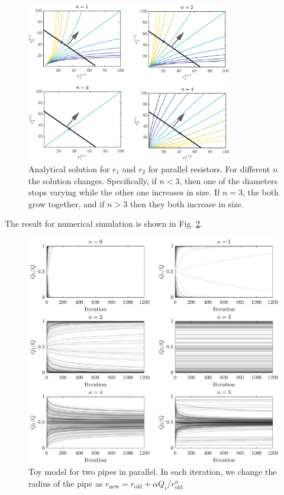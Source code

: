 \begin{figure}[h]
  \centerline{\includegraphics[width=0.8\textwidth]{./Figs/par_resistors}}
  \caption{Analytical solution for $r_1$ and $r_2$ for parallel
    resistors. For different $n$ the solution changes. Specifically,
    if $n<3$, then one of the diameters stops varying while the other
    one increases in size. If $n=3$, the both grow together, and if
    $n>3$ then they both increase in size. }
\label{anal-par}
\end{figure}  


The result for numerical simulation is shown in Fig. \ref{toy-par}.


\begin{figure}[h]
  \centerline{\includegraphics[width=1\textwidth]{./Figs/toy-model-par}}
\caption{Toy model for two pipes in parallel. In each iteration, we
  change the radius of the pipe as $r_{\text{new}} = r_{\text{old}} +  \alpha Q_{i}/r_{\text{old}}^n$}
\label{toy-par}
\end{figure}  

